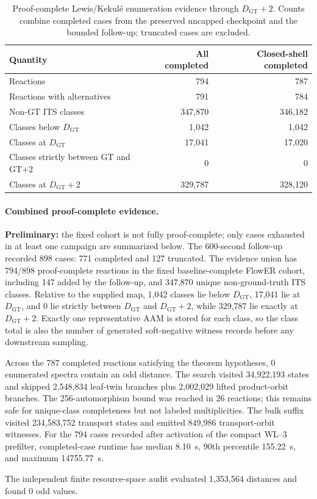 \begin{table}[t]
\centering
\small
\caption{Proof-complete Lewis/Kekul\'e enumeration evidence through $D_{\mathrm{GT}}+2$.  Counts combine completed cases from the preserved uncapped checkpoint and the bounded follow-up; truncated cases are excluded.}
\label{tab:lewis-exhaustive}
\begin{tabular}{lrr}
\toprule
Quantity & All completed & Closed-shell completed \\
\midrule
Reactions & 794 & 787 \\
Reactions with alternatives & 791 & 784 \\
Non-GT ITS classes & 347,870 & 346,182 \\
Classes below $D_{\mathrm{GT}}$ & 1,042 & 1,042 \\
Classes at $D_{\mathrm{GT}}$ & 17,041 & 17,020 \\
Classes strictly between GT and GT$+2$ & 0 & 0 \\
Classes at $D_{\mathrm{GT}}+2$ & 329,787 & 328,120 \\
\bottomrule
\end{tabular}
\end{table}

\paragraph{Combined proof-complete evidence.}
\textbf{Preliminary:} the fixed cohort is not fully proof-complete; only cases exhausted in at least one campaign are summarized below. The 600-second follow-up recorded 898 cases: 771 completed and 127 truncated.  The evidence union has 794/898 proof-complete reactions in the fixed baseline-complete FlowER cohort, including 147 added by the follow-up, and 347,870 unique non-ground-truth ITS classes.  Relative to the supplied map, 1,042 classes lie below $D_{\mathrm{GT}}$, 17,041 lie at $D_{\mathrm{GT}}$, and 0 lie strictly between $D_{\mathrm{GT}}$ and $D_{\mathrm{GT}}+2$, while 329,787 lie exactly at $D_{\mathrm{GT}}+2$.  Exactly one representative AAM is stored for each class, so the class total is also the number of generated soft-negative witness records before any downstream sampling.

Across the 787 completed reactions satisfying the theorem hypotheses, 0 enumerated spectra contain an odd distance.  The search visited 34,922,193 states and skipped 2,548,834 leaf-twin branches plus 2,002,029 lifted product-orbit branches.  The 256-automorphism bound was reached in 26 reactions; this remains safe for unique-class completeness but not labeled multiplicities.  The bulk suffix visited 234,583,752 transport states and emitted 849,986 transport-orbit witnesses.  For the 794 cases recorded after activation of the compact WL--3 prefilter, completed-case runtime has median 8.10~s, 90th percentile 155.22~s, and maximum 14755.77~s.

The independent finite resource-space audit evaluated 1,353,564 distances and found 0 odd values.
